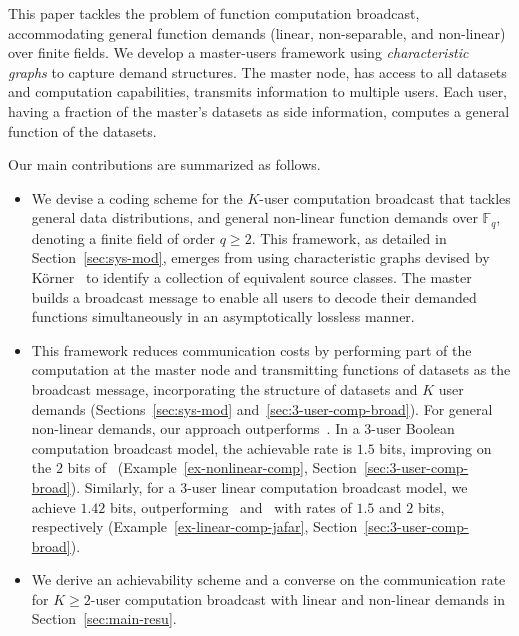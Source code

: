\documentclass[conference, letterpaper]{IEEEtran} %
\begin{document}
This paper tackles the problem of function computation broadcast, accommodating general function demands (linear, non-separable, and non-linear) over finite fields. We develop a master-users framework using {\emph{characteristic graphs}} to capture demand structures. The master node, has access to all datasets and computation capabilities, transmits information to multiple users. Each user, having a fraction of the master's datasets as side information, computes a general function of the datasets.

Our main contributions are summarized as follows.
\begin{itemize}
    \item We devise a coding scheme for the $K$-user computation broadcast that tackles general data distributions, and general non-linear function demands over $\mathbb{F}_q$, denoting a finite field of order $q\geq 2$. 
    This framework, as detailed in  Section~\ref{sec:sys-mod}, emerges from using characteristic graphs devised by K\"orner~\cite{korner1973coding} to identify a collection of equivalent source classes. The master builds a broadcast message to enable all users to decode their demanded functions simultaneously in an asymptotically lossless manner. 


    \item This framework reduces communication costs by performing part of the computation at the master node and transmitting functions of datasets as the broadcast message, incorporating the structure of datasets and $K$ user demands (Sections~\ref{sec:sys-mod} and~\ref{sec:3-user-comp-broad}). For general non-linear demands, our approach outperforms~\cite{SlepWolf1973}. In a $3$-user Boolean computation broadcast model, the achievable rate is $1.5$ bits, improving on the $2$ bits of~\cite{SlepWolf1973} (Example~\ref{ex-nonlinear-comp}, Section~\ref{sec:3-user-comp-broad}). Similarly, for a $3$-user linear computation broadcast model, we achieve $1.42$ bits, outperforming~\cite{yao2024capacity} and~\cite{SlepWolf1973} with rates of $1.5$ and $2$ bits, respectively (Example~\ref{ex-linear-comp-jafar}, Section~\ref{sec:3-user-comp-broad}).

    
    
     \item  We derive an achievability scheme and a converse on the communication rate for $K\geq 2$-user computation broadcast with linear and non-linear demands in Section~\ref{sec:main-resu}. %
\end{itemize}
\end{document}

